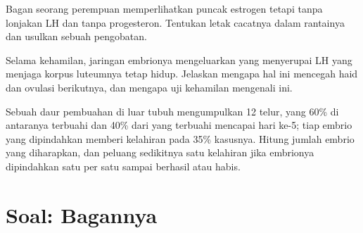 \begin{exercise}[$\star\star\star$]\label{exo:g11:hormones-and-reproduction:13}
Bagan seorang perempuan memperlihatkan puncak estrogen tetapi tanpa
lonjakan LH dan tanpa progesteron. Tentukan letak cacatnya dalam
rantainya dan usulkan sebuah pengobatan.
\end{exercise}

\begin{exercise}[$\star\star\star$]\label{exo:g11:hormones-and-reproduction:14}
Selama kehamilan, jaringan embrionya mengeluarkan  yang
menyerupai LH yang menjaga korpus luteumnya tetap hidup. Jelaskan
mengapa hal ini mencegah haid dan ovulasi berikutnya, dan mengapa uji
kehamilan mengenali  ini.
\end{exercise}

\begin{exercise}[$\star\star\star$]\label{exo:g11:hormones-and-reproduction:15}
Sebuah daur pembuahan di luar tubuh mengumpulkan 12  telur, yang
60\% di antaranya terbuahi dan 40\% dari yang terbuahi mencapai hari
ke-5; tiap embrio yang dipindahkan memberi kelahiran pada 35\%
kasusnya. Hitung jumlah embrio yang diharapkan, dan peluang sedikitnya
satu kelahiran jika embrionya dipindahkan satu per satu sampai berhasil
atau habis.
\end{exercise}

\section{Soal: Bagannya}

